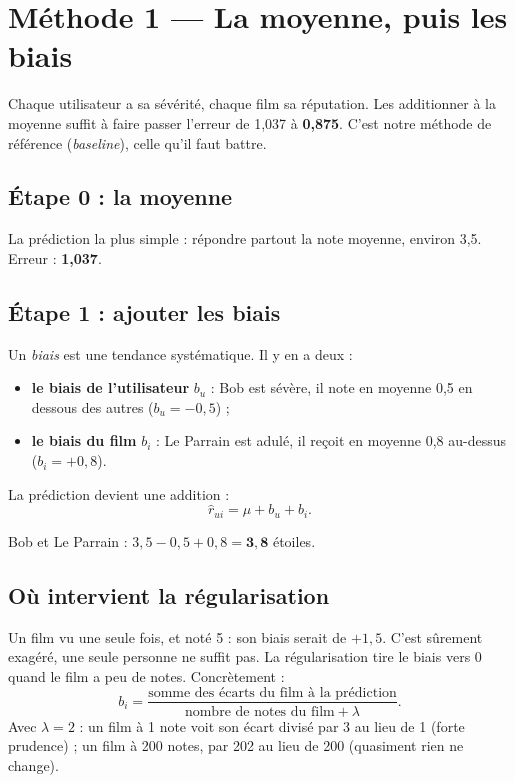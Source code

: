 \documentclass[11pt,a4paper]{article}
\newcommand{\rhat}{\hat r}
\begin{document}
\section{Méthode 1 --- La moyenne, puis les biais}\label{sec:biais}

\begin{enbref}
Chaque utilisateur a sa sévérité, chaque film sa réputation. Les additionner à la
moyenne suffit à faire passer l'erreur de 1,037 à \textbf{0,875}. C'est notre méthode
de référence (\emph{baseline}), celle qu'il faut battre.
\end{enbref}

\subsection{Étape 0 : la moyenne}

La prédiction la plus simple : répondre partout la note moyenne, environ 3,5.
Erreur : \textbf{1,037}.

\subsection{Étape 1 : ajouter les biais}

Un \emph{biais} est une tendance systématique. Il y en a deux :
\begin{itemize}
  \item \textbf{le biais de l'utilisateur} $b_u$ : Bob est sévère, il note en moyenne
        0,5 en dessous des autres ($b_u = -0{,}5$) ;
  \item \textbf{le biais du film} $b_i$ : Le Parrain est adulé, il reçoit en moyenne
        0,8 au-dessus ($b_i = +0{,}8$).
\end{itemize}
La prédiction devient une addition :
\[
  \rhat_{ui} = \mu + b_u + b_i .
\]

\begin{exemple}
Bob et Le Parrain : $3{,}5 - 0{,}5 + 0{,}8 = \mathbf{3{,}8}$ étoiles.
\end{exemple}

\subsection{Où intervient la régularisation}

Un film vu une seule fois, et noté 5 : son biais serait de $+1{,}5$. C'est sûrement
exagéré, une seule personne ne suffit pas. La régularisation tire le biais vers 0
quand le film a peu de notes. Concrètement :
\[
  b_i = \frac{\text{somme des écarts du film à la prédiction}}{\text{nombre de notes du film} + \lambda} .
\]
Avec $\lambda = 2$ : un film à 1 note voit son écart divisé par 3 au lieu de 1 (forte
prudence) ; un film à 200 notes, par 202 au lieu de 200 (quasiment rien ne change).
\end{document}
